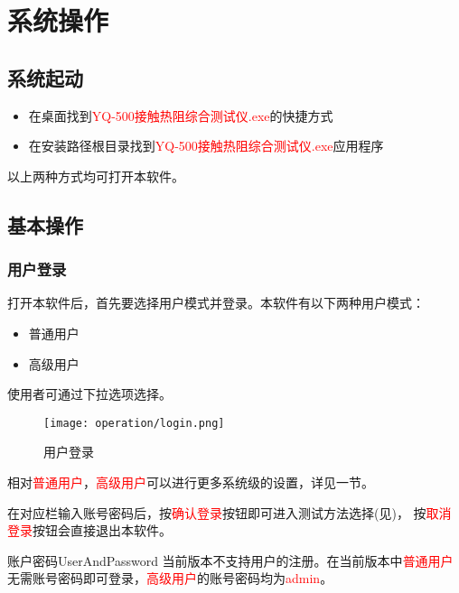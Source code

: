 \chapter{系统操作\label{ch:operation}}
\section{系统起动}
\begin{itemize}
    \item 在桌面找到\textcolor{red}{YQ-500接触热阻综合测试仪.exe}的快捷方式
    \item 在安装路径根目录找到\textcolor{red}{YQ-500接触热阻综合测试仪.exe}应用程序
\end{itemize}
以上两种方式均可打开本软件。
\section{基本操作}
\subsection{用户登录}
打开本软件后，首先要选择用户模式并登录。本软件有以下两种用户模式：
\begin{itemize}
    \item 普通用户
    \item 高级用户
\end{itemize}
使用者可通过下拉选项选择。
\begin{figure}[!h]
    \centering
    \texttt{[image: operation/login.png]}
    \caption{ 用户登录 \label{fig:login}}
\end{figure}
相对\textcolor{red}{普通用户}，\textcolor{red}{高级用户}可以进行更多系统级的设置，详见一节。

在对应栏输入账号密码后，按\textcolor{red}{确认登录}按钮即可进入测试方法选择(见)，
按\textcolor{red}{取消登录}按钮会直接退出本软件。
\begin{tips}{账户密码}{UserAndPassword}
    当前版本不支持用户的注册。在当前版本中\textcolor{red}{普通用户}无需账号密码即可登录，\textcolor{red}{高级用户}的账号密码均为\textcolor{red}{admin}。
\end{tips}
